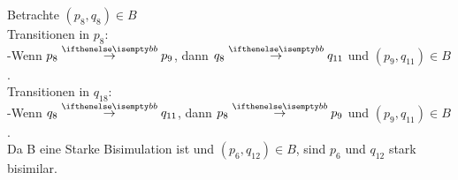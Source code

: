 Betrachte $(p_8, q_{8}) \in B$\\
Transitionen in $p_8$:\\
-Wenn $p_8 \CCSTrans {b} p_9$, dann $q_{8} \CCSTrans {b} q_{11}$ und $(p_9, q_{11}) \in B$.\\
Transitionen in $q_{18}$:\\
-Wenn $q_{8} \CCSTrans {b} q_{11}$, dann $p_{8} \CCSTrans {b} p_{9}$ und $(p_9, q_{11}) \in B$.\\

Da B eine Starke Bisimulation ist und $(p_6, q_{12}) \in B$, sind $p_6$ und $ q_12$ stark bisimilar.

